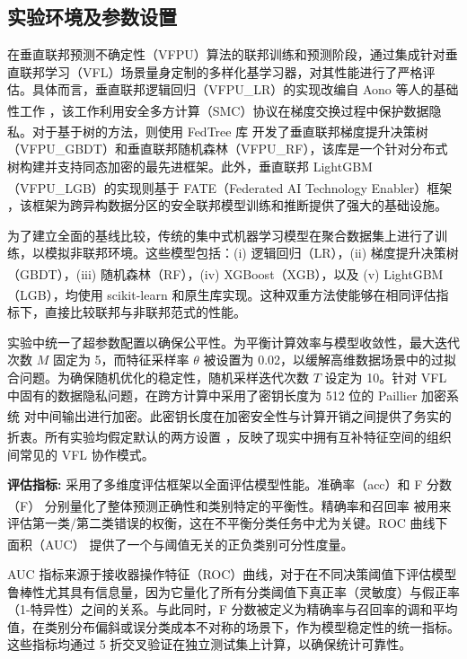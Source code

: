 \subsection{实验环境及参数设置}
在垂直联邦预测不确定性（VFPU）算法的联邦训练和预测阶段，通过集成针对垂直联邦学习（VFL）场景量身定制的多样化基学习器，对其性能进行了严格评估。具体而言，垂直联邦逻辑回归（VFPU\_LR）的实现改编自 Aono 等人的基础性工作 \textsuperscript{\cite{aono2016scalable}}，该工作利用安全多方计算（SMC）协议在梯度交换过程中保护数据隐私。对于基于树的方法，则使用 FedTree 库 \textsuperscript{\cite{li2022fedtree}} 开发了垂直联邦梯度提升决策树（VFPU\_GBDT）和垂直联邦随机森林（VFPU\_RF），该库是一个针对分布式树构建并支持同态加密的最先进框架。此外，垂直联邦 LightGBM（VFPU\_LGB）的实现则基于 FATE（Federated AI Technology Enabler）框架 \textsuperscript{\cite{liu2021fate}}，该框架为跨异构数据分区的安全联邦模型训练和推断提供了强大的基础设施。  

为了建立全面的基线比较，传统的集中式机器学习模型在聚合数据集上进行了训练，以模拟非联邦环境。这些模型包括：(i) 逻辑回归（LR），(ii) 梯度提升决策树（GBDT），(iii) 随机森林（RF），(iv) XGBoost（XGB）\textsuperscript{\cite{chen2015xgboost}}，以及 (v) LightGBM（LGB）\textsuperscript{\cite{ke2017lightgbm}}，均使用 scikit-learn \textsuperscript{\cite{pedregosa2011scikit}} 和原生库实现。这种双重方法使能够在相同评估指标下，直接比较联邦与非联邦范式的性能。  

实验中统一了超参数配置以确保公平性。为平衡计算效率与模型收敛性，最大迭代次数 $ M $ 固定为 5，而特征采样率 $ \theta $ 被设置为 0.02，以缓解高维数据场景中的过拟合问题。为确保随机优化的稳定性，随机采样迭代次数 $ T $ 设定为 10。针对 VFL 中固有的数据隐私问题，在跨方计算中采用了密钥长度为 512 位的 Paillier 加密系统 \textsuperscript{\cite{paillier1999public}} 对中间输出进行加密。此密钥长度在加密安全性与计算开销之间提供了务实的折衷。所有实验均假定默认的两方设置 \textsuperscript{\cite{li2022fedtree}}，反映了现实中拥有互补特征空间的组织间常见的 VFL 协作模式。  

\textbf{评估指标:}  
采用了多维度评估框架以全面评估模型性能。准确率（acc）和 F 分数（F）\textsuperscript{\cite{cheng2021secureboost}} 分别量化了整体预测正确性和类别特定的平衡性。精确率和召回率 \textsuperscript{\cite{liu2003building}} 被用来评估第一类/第二类错误的权衡，这在不平衡分类任务中尤为关键。ROC 曲线下面积（AUC）\textsuperscript{\cite{cheng2021secureboost}} 提供了一个与阈值无关的正负类别可分性度量。  

AUC 指标来源于接收器操作特征（ROC）曲线，对于在不同决策阈值下评估模型鲁棒性尤其具有信息量，因为它量化了所有分类阈值下真正率（灵敏度）与假正率（1-特异性）之间的关系。与此同时，F 分数被定义为精确率与召回率的调和平均值，在类别分布偏斜或误分类成本不对称的场景下，作为模型稳定性的统一指标。这些指标均通过 5 折交叉验证在独立测试集上计算，以确保统计可靠性。  
